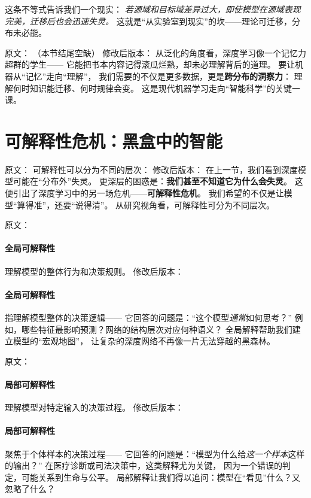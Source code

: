 这条不等式告诉我们一个现实：  
\textit{若源域和目标域差异过大，即使模型在源域表现完美，迁移后也会迅速失灵。}  
这就是“从实验室到现实”的坎——理论可迁移，分布未必能。



原文：
（本节结尾空缺）
修改后版本：
从泛化的角度看，深度学习像一个记忆力超群的学生——  
它能把书本内容记得滚瓜烂熟，却未必理解背后的道理。  
要让机器从“记忆”走向“理解”，  
我们需要的不仅是更多数据，更是\textbf{跨分布的洞察力}：  
理解何时知识能迁移、何时规律会变。  
这是现代机器学习走向“智能科学”的关键一课。

\section{可解释性危机：黑盒中的智能}

原文：
可解释性可以分为不同的层次：
修改后版本：
在上一节，我们看到深度模型可能在“分布外”失灵。  
更深层的困惑是：\textbf{我们甚至不知道它为什么会失灵}。  
这便引出了深度学习中的另一场危机——\textbf{可解释性危机}。  
我们希望的不仅是让模型“算得准”，还要“说得清”。  
从研究视角看，可解释性可分为不同层次。



原文：
\paragraph{全局可解释性}
理解模型的整体行为和决策规则。
修改后版本：
\paragraph{全局可解释性}  
指理解模型整体的决策逻辑——  
它回答的问题是：“这个模型\textit{通常}如何思考？”  
例如，哪些特征最影响预测？网络的结构层次对应何种语义？  
全局解释帮助我们建立模型的“宏观地图”，  
让复杂的深度网络不再像一片无法穿越的黑森林。



原文：
\paragraph{局部可解释性}
理解模型对特定输入的决策过程。
修改后版本：
\paragraph{局部可解释性}  
聚焦于个体样本的决策过程——  
它回答的问题是：“模型为什么给\textit{这一个样本}这样的输出？”  
在医疗诊断或司法决策中，这类解释尤为关键，  
因为一个错误的判定，可能关系到生命与公平。  
局部解释让我们得以追问：模型在“看见”什么？又忽略了什么？



